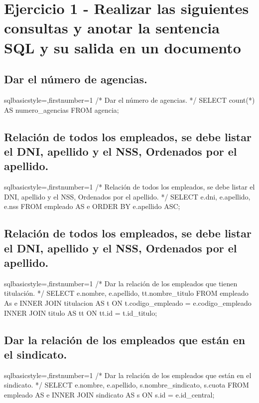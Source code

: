 \section{Ejercicio 1 - Realizar las siguientes consultas y anotar la sentencia SQL y su salida en un documento}
		
	\subsection{Dar el número de agencias.}
		\begin{sourcecodep}[]{sql}{basicstyle={\fontsize{10}{10}\selectfont\ttfamily},firstnumber=1}{}
			/* Dar el número de agencias. */
			SELECT count(*) AS numero_agencias
				FROM agencia; \end{sourcecodep}
	\subsection{Relación de todos los empleados, se debe listar el DNI, apellido y el NSS, Ordenados por el apellido.}
		\begin{sourcecodep}[]{sql}{basicstyle={\fontsize{10}{10}\selectfont\ttfamily},firstnumber=1}{}
			/* Relación de todos los empleados, se debe listar el DNI, apellido y el NSS, Ordenados por el apellido. */
			SELECT e.dni, e.apellido, e.nss FROM empleado AS e
				ORDER BY e.apellido ASC;\end{sourcecodep}
\newpage
	\subsection{Relación de todos los empleados, se debe listar el DNI, apellido y el NSS, Ordenados por el apellido.}
		\begin{sourcecodep}[]{sql}{basicstyle={\fontsize{10}{10}\selectfont\ttfamily},firstnumber=1}{}
			/* Dar la relación de los empleados que tienen titulación. */
			SELECT e.nombre, e.apellido, tt.nombre_titulo FROM empleado As e
				INNER JOIN titulacion AS t ON t.codigo_empleado = e.codigo_empleado
				INNER JOIN titulo AS tt ON tt.id = t.id_titulo;\end{sourcecodep}
	\subsection{Dar la relación de los empleados que están en el sindicato.}
		\begin{sourcecodep}[]{sql}{basicstyle={\fontsize{10}{10}\selectfont\ttfamily},firstnumber=1}{}
			/* Dar la relación de los empleados que están en el sindicato. */
			SELECT e.nombre, e.apellido, s.nombre_sindicato, s.cuota FROM empleado AS e
				INNER JOIN sindicato AS s ON s.id = e.id_central;\end{sourcecodep}
\newpage
